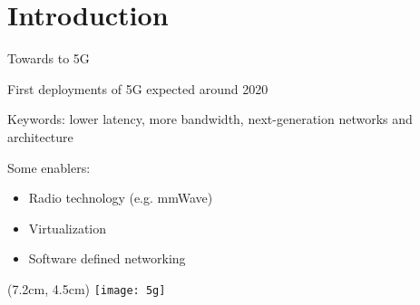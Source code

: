 \section{Introduction}
\begin{frame}{Towards to 5G}

  First deployments of 5G expected around 2020

  \vfill{}

  Keywords: lower latency, more bandwidth, next-generation networks and
  architecture

  \vfill{}

  Some enablers:
  \begin{itemize}
    \item Radio technology (e.g. mmWave)
    \item Virtualization
    \item Software defined networking
  \end{itemize}


  \begin{textblock*}{1cm}(7.2cm, 4.5cm)
    \texttt{[image: 5g]}
  \end{textblock*}

\end{frame}